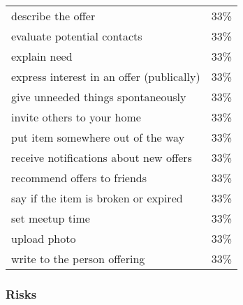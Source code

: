 \begin{longtable}{p{}r}
describe the offer                                                   & 33\%                        \\
evaluate potential contacts                                          & 33\%                        \\
explain need                                                         & 33\%                        \\
express interest in an offer (publically)                            & 33\%                        \\
give unneeded things spontaneously                                   & 33\%                        \\
invite others to your home                                           & 33\%                        \\
put item somewhere out of the way                                    & 33\%                        \\
receive notifications about new offers                               & 33\%                        \\
recommend offers to friends                                          & 33\%                        \\
say if the item is broken or expired                                 & 33\%                        \\
set meetup time                                                      & 33\%                        \\
upload photo                                                         & 33\%                        \\
write to the person offering                                         & 33\%
\end{longtable}

\subsubsection*{Risks}

